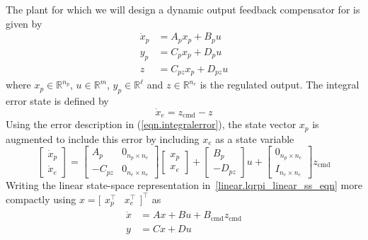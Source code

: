 The plant for which we will design a dynamic output feedback compensator for is given by
\begin{equation*}
  \begin{split}
    \dot{x}_{p}&=A_{p}x_{p}+B_{p}u \\
    y_{p}&=C_{p}x_{p}+D_{p}u \\
    z&=C_{pz}x_{p}+D_{pz}u
  \end{split}
\end{equation*}
where $x_{p}\in\mathbb{R}^{n_{p}}$, $u\in\mathbb{R}^{m}$, $y_{p}\in\mathbb{R}^{\ell}$ and $z\in\mathbb{R}^{n_{e}}$ is the regulated output.
The integral error state is defined by
\begin{equation}
  \label{eqn.integralerror}
  \dot{x}_{e}=z_{\text{cmd}}-z
\end{equation}
Using the error description in (\ref{eqn.integralerror}), the state vector $x_{p}$ is augmented to include this error by including $x_{e}$ as a state variable
\begin{equation}
  \label{linear.lqrpi_linear_ss_eqn}
  \begin{bmatrix}
    \dot{x}_{p} \\
    \dot{x}_{e}
  \end{bmatrix}
  =
  \begin{bmatrix}
    A_{p} & 0_{n_{p}\times n_{e}} \\
    -C_{pz} & 0_{n_{e}\times n_{e}}
  \end{bmatrix}
  \begin{bmatrix}
    x_{p} \\
    x_{e}
  \end{bmatrix}
  +
  \begin{bmatrix}
    B_{p} \\
    -D_{pz}
  \end{bmatrix}u
  +
  \begin{bmatrix}
    0_{n_{p}\times n_{e}} \\
    I_{n_{e}\times n_{e}}
  \end{bmatrix}z_{\text{cmd}}
\end{equation}
Writing the linear state-space representation in~\eqref{linear.lqrpi_linear_ss_eqn} more compactly using $x=\bigr[\begin{array}{cc} x_{p}^{\top} & x_{e}^{\top} \end{array}\bigr]^{\top}$ as
\begin{equation*}
  \begin{split}
    \dot{x}&=Ax+Bu+B_{\text{cmd}}z_{\text{cmd}} \\
    y&=Cx+Du
  \end{split}
\end{equation*}
